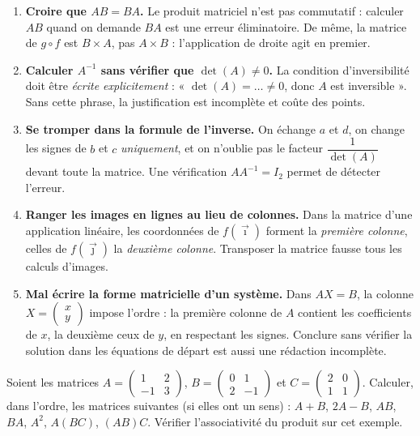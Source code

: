 \documentclass[11pt]{article}
\newcounter{popsec}
\newcounter{popsub}
\newcommand{\courssub}[1]{%
  \stepcounter{popsub}%
  \par\vspace{9pt}\noindent{\popxbold\fontsize{11.5}{13}\selectfont\color{popink}{\color{poporange}\thepopsec.\thepopsub}\hspace{6pt}#1}\par\nopagebreak\vspace{4pt}
}
\begin{document}
\begin{attention}
\begin{enumerate}
\item \textbf{Croire que $AB=BA$.} Le produit matriciel n'est pas commutatif : calculer $AB$ quand on demande $BA$ est une erreur éliminatoire. De même, la matrice de $g\circ f$ est $B\times A$, pas $A\times B$ : l'application de droite agit en premier.
\item \textbf{Calculer $A^{-1}$ sans vérifier que $\det(A)\neq 0$.} La condition d'inversibilité doit être \emph{écrite explicitement} : « $\det(A)=\ldots\neq 0$, donc $A$ est inversible ». Sans cette phrase, la justification est incomplète et coûte des points.
\item \textbf{Se tromper dans la formule de l'inverse.} On échange $a$ et $d$, on change les signes de $b$ et $c$ \emph{uniquement}, et on n'oublie pas le facteur $\dfrac{1}{\det(A)}$ devant toute la matrice. Une vérification $AA^{-1}=I_2$ permet de détecter l'erreur.
\item \textbf{Ranger les images en lignes au lieu de colonnes.} Dans la matrice d'une application linéaire, les coordonnées de $f(\vec{\imath})$ forment la \emph{première colonne}, celles de $f(\vec{\jmath})$ la \emph{deuxième colonne}. Transposer la matrice fausse tous les calculs d'images.
\item \textbf{Mal écrire la forme matricielle d'un système.} Dans $AX=B$, la colonne $X=\begin{pmatrix} x \\ y \end{pmatrix}$ impose l'ordre : la première colonne de $A$ contient les coefficients de $x$, la deuxième ceux de $y$, en respectant les signes. Conclure sans vérifier la solution dans les équations de départ est aussi une rédaction incomplète.
\end{enumerate}
\end{attention}

\courssub{Exercices d'entraînement}

\begin{exercice}
Soient les matrices $A=\begin{pmatrix} 1 & 2 \\ -1 & 3 \end{pmatrix}$, $B=\begin{pmatrix} 0 & 1 \\ 2 & -1 \end{pmatrix}$ et $C=\begin{pmatrix} 2 & 0 \\ 1 & 1 \end{pmatrix}$.
Calculer, dans l'ordre, les matrices suivantes (si elles ont un sens) :
$A+B$, $2A-B$, $AB$, $BA$, $A^2$, $A(BC)$, $(AB)C$.
Vérifier l'associativité du produit sur cet exemple.
\end{exercice}
\end{document}

